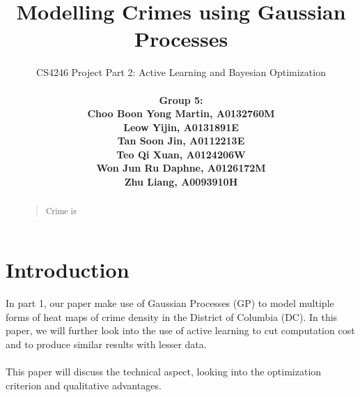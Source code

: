 \documentclass[letterpaper]{article}
\begin{document}
	\title{Modelling Crimes using Gaussian Processes}
	\author{CS4246 Project Part 2: Active Learning and Bayesian Optimization\\ \\
	\bf \small Group 5:\\
	\small Choo Boon Yong Martin, A0132760M\\
	\small Leow Yijin, A0131891E\\
	\small Tan Soon Jin, A0112213E\\
	\small Teo Qi Xuan, A0124206W\\
	\small Won Jun Ru Daphne, A0126172M\\
	\small Zhu Liang, A0093910H\\
	}	
	
	
	\maketitle
	\thispagestyle{empty}
	\pagestyle{empty}
	
	
	
	\begin{abstract}
	\begin{quote}
	Crime is 

	\end{quote}
	\end{abstract}
	
	
	\section{Introduction}
	
	In part 1, our paper make use of Gaussian Processes (GP) to model multiple forms of heat maps of crime density in the District of Columbia (DC).
	In this paper, we will further look into the use of active learning to cut computation cost and to produce similar results with lesser data.\\ \\

	This paper will discuss the technical aspect, looking into the optimization criterion and qualitative advantages. 
	


	\printbibliography
\end{document}
